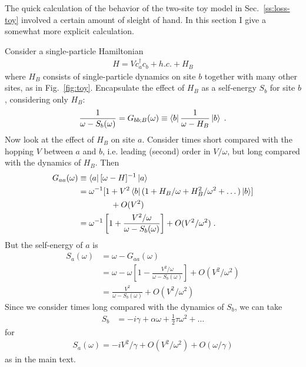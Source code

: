 \documentclass[aps,prb,nofootinbib,twocolumn,balancelastpage,amsmath,amssymb,floatfix,superscriptaddress,]{revtex4-1}
\begin{document}
The quick calculation of the behavior of the two-site toy model in Sec.~\ref{ss:loss-toy} involved a certain amount of sleight of hand.
In this section I give a somewhat more explicit calculation.

Consider a single-particle Hamiltonian
\begin{align}
  \label{eq:toy-app}
  H = V c^\dagger_a c_b + h.c. + H_{B}
\end{align}
where $H_B$ consists of single-particle dynamics on site $b$ together with many other sites, as in Fig.~\ref{fig:toy}.
Encapsulate the effect of $H_B$ as a self-energy $S_b$ for site $b$, considering only $H_B$:
\begin{align}
  \frac 1 {\omega - S_b(\omega)} = G_{bb;B}(\omega) \equiv \bra b \frac 1 {\omega - H_B} \ket b\;.
\end{align}
Now look at the effect of $H_B$ on site $a$.
Consider times short compared with the hopping $V$ between $a$ and $b$,
i.e. leading (second) order in $V/\omega$,
but long compared with the dynamics of $H_B$.
Then
\begin{align}
  \begin{split}
  G_{aa}(\omega) &\equiv \bra a [\omega - H]^{-1} \ket a \\
  &= \omega^{-1}  [1 + V^2 \bra b (1 + H_B/\omega + H_B^2/\omega^2 + \dots) \ket b]\\
  &\qquad\qquad+ O(V^2) \\
                 &= \omega^{-1} \left[1 + \frac {V^2/\omega} {\omega - S_b(\omega)}\right] + O(V^2/\omega^2)\;.
               \end{split}
\end{align}
But the self-energy of $a$ is
\begin{align}
  S_a(\omega) &= \omega - G_{aa}(\omega) \\
              &= \omega - \omega\left[1 -  \frac {V^2/\omega} {\omega - S_b(\omega)}\right] + O(V^2/\omega^2)\\
              &= \frac {V^2}{\omega - S_b(\omega)} + O(V^2/\omega^2)
\end{align}
Since we consider times long compared with the dynamics of $S_b$, we can take
\begin{align}
  S_b &= -i\gamma + \alpha \omega + \frac 1 2 \tau \omega^2 + \dots
\end{align}
for
\begin{align}
  S_a(\omega) = -i V^2/\gamma + O(V^2/\omega^2) + O(\omega/\gamma)
\end{align}
as in the main text.
\end{document}
